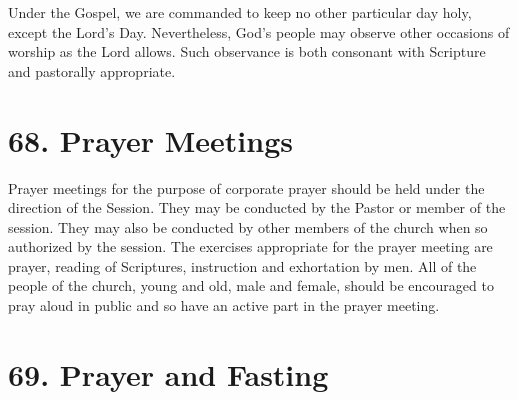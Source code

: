 \documentclass[
]{book}
\begin{document}
\protect\hypertarget{chapter-slug-67-other-occasions-of-public-worship}{\href{}{}}

\protect\hypertarget{67}{\href{}{}}Under the Gospel, we are commanded to keep no other particular day holy, except the Lord's Day. Nevertheless, God's people may observe other occasions of worship as the Lord allows. Such observance is both consonant with Scripture and pastorally appropriate.

\hypertarget{prayer-meetings}{%
\section*{68. Prayer Meetings}\label{prayer-meetings}}

\protect\hypertarget{chapter-slug-68-prayer-meetings}{\href{}{}}

\protect\hypertarget{68}{\href{}{}}Prayer meetings for the purpose of corporate prayer should be held under the direction of the Session. They may be conducted by the Pastor or member of the session. They may also be conducted by other members of the church when so authorized by the session. The exercises appropriate for the prayer meeting are prayer, reading of Scriptures, instruction and exhortation by men. All of the people of the church, young and old, male and female, should be encouraged to pray aloud in public and so have an active part in the prayer meeting.

\hypertarget{prayer-and-fasting}{%
\section*{69. Prayer and Fasting}\label{prayer-and-fasting}}

\protect\hypertarget{chapter-slug-69-prayer-and-fasting}{\href{}{}}
\end{document}
